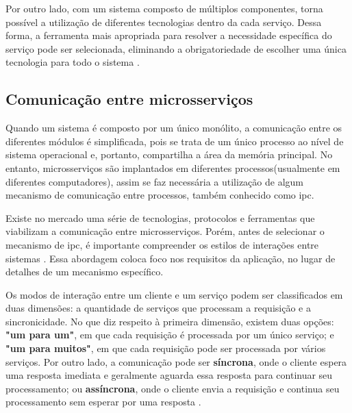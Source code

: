 Por outro lado, com um sistema composto de múltiplos componentes, torna possível a utilização de diferentes tecnologias dentro da cada serviço. Dessa forma, a ferramenta mais apropriada para resolver a necessidade específica do serviço pode ser selecionada, eliminando a obrigatoriedade de escolher uma única tecnologia para todo o sistema \cite{buildingMicroservices}.

\subsection{Comunicação entre microsserviços}
Quando um sistema é composto por um único monólito, a comunicação entre os diferentes módulos é simplificada, pois se trata de um único processo ao nível de sistema operacional e, portanto, compartilha a área da memória principal. No entanto, microsserviços são implantados em diferentes processos(usualmente em diferentes computadores), assim se faz necessária a utilização de algum mecanismo de comunicação entre processos, também conhecido como \acrfull{ipc}.

Existe no mercado uma série de tecnologias, protocolos e ferramentas que viabilizam a comunicação entre microsserviços. Porém, antes de selecionar o mecanismo de \acrshort{ipc}, é importante compreender os estilos de interações entre sistemas \cite{richardson2018microservices}. Essa abordagem coloca foco nos requisitos da aplicação, no lugar de detalhes de um mecanismo específico.

Os modos de interação entre um cliente e um serviço podem ser classificados em duas dimensões: a quantidade de serviços que processam a requisição e a sincronicidade. No que diz respeito à primeira dimensão, existem duas opções: \textbf{"um para um"}, em que cada requisição é processada por um único serviço; e \textbf{"um para muitos"}, em que cada requisição pode ser processada por vários serviços. Por outro lado, a comunicação pode ser \textbf{síncrona}, onde o cliente espera uma resposta imediata e geralmente aguarda essa resposta para continuar seu processamento; ou \textbf{assíncrona}, onde o cliente envia a requisição e continua seu processamento sem esperar por uma resposta \cite{richardson2018microservices}.

